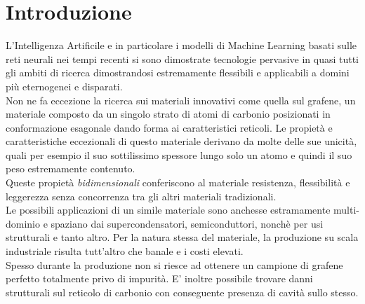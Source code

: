 \documentclass[12pt,a4paper,openright,twoside]{report}
\begin{document}
\chapter*{Introduzione}                 %
L'Intelligenza Artificile e in particolare i modelli di Machine Learning basati sulle reti neurali nei tempi recenti si sono dimostrate tecnologie pervasive in quasi tutti gli ambiti di ricerca dimostrandosi estremamente flessibili e applicabili a domini più eternogenei e disparati. \\

Non ne fa eccezione la ricerca sui materiali innovativi come quella sul grafene, un materiale composto da un singolo strato di atomi di carbonio posizionati in conformazione esagonale dando forma ai caratteristici reticoli.
Le propietà e caratteristiche eccezionali di questo materiale derivano da molte delle sue unicità, quali per esempio il suo sottilissimo spessore lungo solo un atomo e quindi il suo peso estremamente contenuto. \\
Queste propietà \emph{bidimensionali} conferiscono al materiale resistenza, flessibilità e leggerezza senza concorrenza tra gli altri materiali tradizionali. \\
Le possibili applicazioni di un simile materiale sono anchesse estramamente multi-dominio e spaziano dai supercondensatori, semiconduttori, nonchè per usi strutturali e tanto altro. 
Per la natura stessa del materiale, la produzione su scala industriale risulta tutt'altro che banale e i costi elevati. \\
Spesso durante la produzione non si riesce ad ottenere un campione di grafene perfetto totalmente privo di impurità. E' inoltre possibile trovare danni strutturali sul reticolo di carbonio con conseguente presenza di cavità sullo stesso. \\
\end{document}
